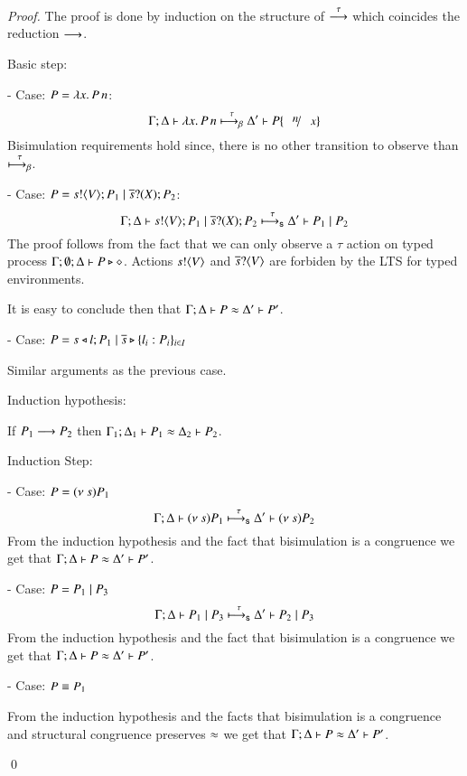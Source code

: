 \begin{proof}
	\noi The proof is done by induction on the structure of $\stackrel{\tau}{\longrightarrow}$
	which coincides the reduction $\longrightarrow$.

	\noi Basic step:

	\noi - Case: $P = \lambda x.\,P\,n$:
%
	\[
		\horel{\Gamma}{\Delta}{\appl{\abs{x}{P}}{n}}{\bhby{\tau}}{\Delta'}{P \subst{n}{x}}
	\]
%
	\noi Bisimulation requirements hold since, there is no other transition to observe than ${\stackrel{\tau}{\longmapsto_{\mathsf{\beta}}}}$.

	\noi - Case: $P = s ! \langle V \rangle ; P_1 \;|\; \overline{s} ? (X) ; P_2$:
%
	\[
		\Gamma; \Delta \vdash s ! \langle V \rangle ; P_1 \;|\; \overline{s} ? (X) ; P_2 \stackrel{\tau}{\longmapsto_{\mathsf{s}}} \Delta' \vdash P_1 \;|\; P_2
	\]
%
	\noi The proof follows from the fact that we can only observe a $\tau$
	action on typed process
	$\Gamma; \emptyset; \Delta \vdash P \triangleright \diamond$.
	Actions $s ! \langle V \rangle$ and $\overline{s} ? \langle V \rangle$
	are forbiden by the LTS for typed environments.

	\noi It is easy to conclude then that $\Gamma; \Delta \vdash P \approx \Delta' \vdash P'$.

	\noi - Case: $P = s \triangleleft l ; P_1 \;|\; \overline{s} \triangleright \{l_i: P_i\}_{i \in I}$

	\noi Similar arguments as the previous case.

	\noi Induction hypothesis:

	\noi If $P_1 \longrightarrow P_2$ then $\Gamma_1; \Delta_1 \vdash P_1 \approx \Delta_2 \vdash P_2$.

	\noi Induction Step:

	\noi - Case: $P = (\nu\ s) P_1$
%
	\[
		\Gamma; \Delta \vdash (\nu\ s){P_1} \stackrel{\tau}{\longmapsto_{\mathsf{s}}} \Delta' \vdash (\nu\ s) P_2
	\]
%
	\noi From the induction hypothesis and the fact that bisimulation is a congruence
	we get that $\Gamma; \Delta \vdash P \approx \Delta' \vdash P'$.

	\noi - Case: $P = P_1 \;|\; P_3$
%
	\[
		\Gamma; \Delta \vdash P_1 \;|\; P_3 \stackrel{\tau}{\longmapsto_{\mathsf{s}}} \Delta' \vdash P_2 \;|\; P_3
	\]
%
	\noi From the induction hypothesis and the fact that bisimulation is a congruence
	we get that $\Gamma; \Delta \vdash P \approx \Delta' \vdash P'$.

	\noi - Case: $P \equiv P_1$

	From the induction hypothesis and the facts that bisimulation is a congruence
	and structural congruence preserves $\approx$
	we get that $\Gamma; \Delta \vdash P \approx \Delta' \vdash P'$.


	\qed
\end{proof}


